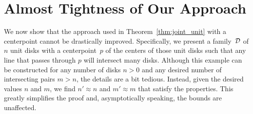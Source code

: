 \documentclass{llncs}
\begin{document}
\section{Almost Tightness of Our Approach}
\label{sec:lowerbound}

We now show that the approach used in Theorem~\ref{thm:joint_unit} 
with a centerpoint
cannot be drastically improved. 
Specifically, we present a family~${\cal D}$ of $n$ unit disks
with a centerpoint~$p$ of the centers of those unit disks
such that any line that passes through $p$
will intersect many disks. 
Although this example can be constructed for any number of disks $n>0$ and 
any desired number of intersecting pairs $m>n$, the details are a bit tedious.
Instead, given the desired values $n$ and $m$, we find $n'\approx n$ and $m'\approx m$ that satisfy the properties. This greatly simplifies the proof and, asymptotically speaking, the bounds are unaffected.
\end{document}
